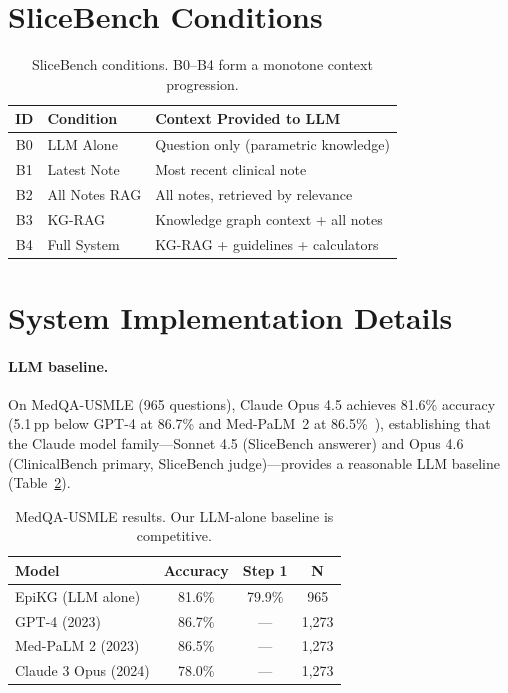 \section{SliceBench Conditions}
\label{app:slicebench_conditions}

\begin{table}[ht]
\centering
\small
\caption{SliceBench conditions. B0--B4 form a monotone context progression.}
\label{tab:slicebench_conditions}
\begin{tabular}{@{}clp{7.5cm}@{}}
\toprule
ID & Condition & Context Provided to LLM \\
\midrule
B0 & LLM Alone & Question only (parametric knowledge) \\
B1 & Latest Note & Most recent clinical note \\
B2 & All Notes RAG & All notes, retrieved by relevance \\
B3 & KG-RAG & Knowledge graph context + all notes \\
B4 & Full System & KG-RAG + guidelines + calculators \\
\bottomrule
\end{tabular}
\end{table}


\section{System Implementation Details}
\label{app:supporting}

\paragraph{LLM baseline.}
On MedQA-USMLE (965 questions), Claude Opus 4.5 achieves 81.6\% accuracy (5.1\,pp below GPT-4 at 86.7\% and Med-PaLM~2 at 86.5\%~\cite{medagentbench2025}), establishing that the Claude model family---Sonnet 4.5 (SliceBench answerer) and Opus 4.6 (ClinicalBench primary, SliceBench judge)---provides a reasonable LLM baseline (Table~\ref{tab:medqa}).

\begin{table}[ht]
\centering
\small
\begin{tabular}{lccc}
\toprule
\textbf{Model} & \textbf{Accuracy} & \textbf{Step 1} & \textbf{N} \\
\midrule
EpiKG (LLM alone) & 81.6\% & 79.9\% & 965 \\
GPT-4 (2023) & 86.7\% & --- & 1{,}273 \\
Med-PaLM 2 (2023) & 86.5\% & --- & 1{,}273 \\
Claude 3 Opus (2024) & 78.0\% & --- & 1{,}273 \\
\bottomrule
\end{tabular}
\caption{MedQA-USMLE results. Our LLM-alone baseline is competitive.}
\label{tab:medqa}
\end{table}

